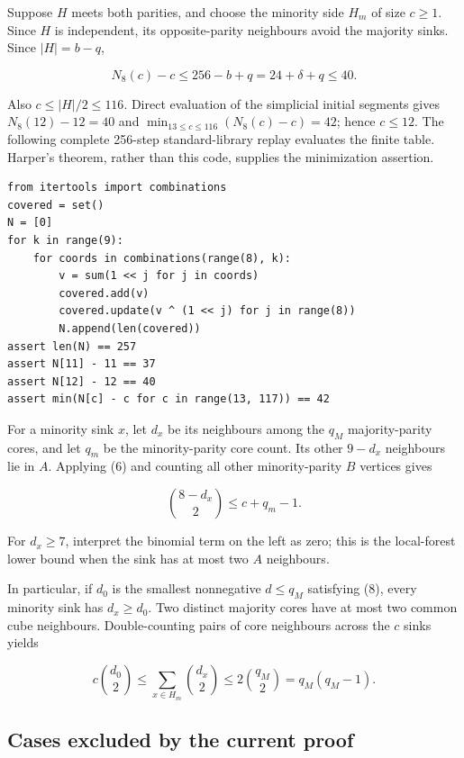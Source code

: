 \documentclass[11pt,a4paper]{article}
\begin{document}
Suppose \(H\) meets both parities, and choose the minority side \(H_m\) of size \(c\ge1\). Since \(H\) is independent, its opposite-parity neighbours avoid the majority sinks. Since \(|H|=b-q\),

\[
N_8(c)-c\le256-b+q=24+\delta+q\le40.\tag{7}
\]

Also \(c\le|H|/2\le116\). Direct evaluation of the simplicial initial segments gives \(N_8(12)-12=40\) and \(\min_{13\le c\le116}(N_8(c)-c)=42\); hence \(c\le12\). The following complete 256-step standard-library replay evaluates the finite table. Harper's theorem, rather than this code, supplies the minimization assertion.

\begin{Verbatim}[breaklines,breakanywhere,fontsize=\footnotesize]
from itertools import combinations
covered = set()
N = [0]
for k in range(9):
    for coords in combinations(range(8), k):
        v = sum(1 << j for j in coords)
        covered.add(v)
        covered.update(v ^ (1 << j) for j in range(8))
        N.append(len(covered))
assert len(N) == 257
assert N[11] - 11 == 37
assert N[12] - 12 == 40
assert min(N[c] - c for c in range(13, 117)) == 42
\end{Verbatim}

For a minority sink \(x\), let \(d_x\) be its neighbours among the \(q_M\) majority-parity cores, and let \(q_m\) be the minority-parity core count. Its other \(9-d_x\) neighbours lie in \(A\). Applying (6) and counting all other minority-parity \(B\) vertices gives

\[
\binom{8-d_x}{2}\le c+q_m-1.\tag{8}
\]

For \(d_x\ge7\), interpret the binomial term on the left as zero; this is the local-forest lower bound when the sink has at most two \(A\) neighbours.

In particular, if \(d_0\) is the smallest nonnegative \(d\le q_M\) satisfying (8), every minority sink has \(d_x\ge d_0\). Two distinct majority cores have at most two common cube neighbours. Double-counting pairs of core neighbours across the \(c\) sinks yields

\[
c\binom{d_0}{2}\le\sum_{x\in H_m}\binom{d_x}{2}\le2\binom{q_M}{2}=q_M(q_M-1).\tag{9}
\]

\subsection{Cases excluded by the current proof}\label{cases-excluded-by-the-current-proof}
\end{document}
